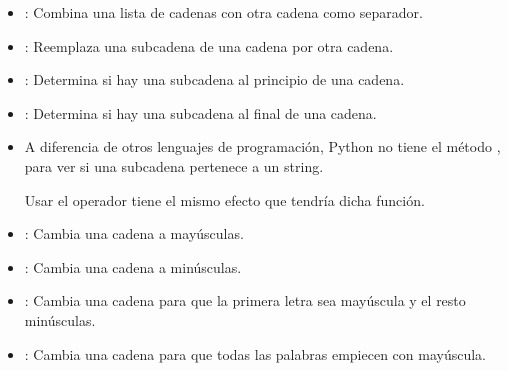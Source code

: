 \begin{itemize}
  \item {}: Combina una lista de cadenas con otra cadena como separador.
  

  \item {}: Reemplaza una subcadena de una cadena por otra cadena.



  \item {}: Determina si hay una subcadena al principio de una cadena.


  \item {}: Determina si hay una subcadena al final de una cadena.
  

  \item A diferencia de otros lenguajes de programación, Python no tiene el método , para ver si una subcadena pertenece a un string.
  
  Usar el operador  tiene el mismo efecto que tendría dicha función.



  \item {}: Cambia una cadena a mayúsculas.
  

  \item {}: Cambia una cadena a minúsculas.
  

  \item {}: Cambia una cadena para que la primera letra sea mayúscula y el resto minúsculas.

  
  \item {}: Cambia una cadena para que todas las palabras empiecen con mayúscula.
  

\end{itemize}

